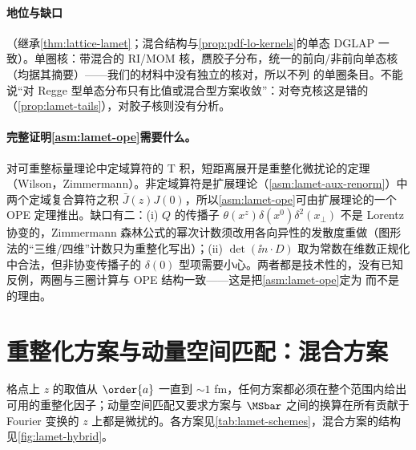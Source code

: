 \paragraph{地位与缺口}
\tagA（继承\cref{thm:lattice-lamet}；混合结构与\cref{prop:pdf-lo-kernels}的单态 DGLAP 一致）。单圈核：带混合的 RI/MOM 核\cite{Wang:2019tgg}，赝胶子分布\cite{Balitsky:2019krf}，统一的前向/非前向单态核\cite{Yao:2022vtp}（均据其摘要）——我们的材料中没有独立的核对，所以不列 \tagR 的单圈条目。不能说“对 Regge 型单态分布只有比值或混合型方案收敛”：对夸克核这是错的（\cref{prop:lamet-tails}），对胶子核则没有分析。

\paragraph{完整证明\cref{asm:lamet-ope}需要什么。}
对可重整标量理论中定域算符的 T 积，短距离展开是重整化微扰论的定理（Wilson\cite{Wilson1969}，Zimmermann\cite{Zimmermann1973}）。非定域算符是扩展理论（\cref{asm:lamet-aux-renorm}）中两个定域复合算符之积 $\bar J(z)J(0)$，所以\cref{asm:lamet-ope}可由扩展理论的一个 OPE 定理推出。缺口有二：(i) $Q$ 的传播子 $\theta(x^z)\delta(x^0)\delta^2(x_\perp)$ 不是 Lorentz 协变的，Zimmermann 森林公式的幂次计数须改用各向异性的发散度重做（图形法的“三维/四维”计数只为重整化写出）；(ii) $\det(\ii n\cdot D)$ 取为常数在维数正规化中合法，但非协变传播子的 $\delta(0)$ 型项需要小心。两者都是技术性的，没有已知反例，两圈与三圈计算与 OPE 结构一致——这是把\cref{asm:lamet-ope}定为 \tagA 而不是 \tagC 的理由。

\section{重整化方案与动量空间匹配：混合方案}\label{sec:lamet-schemes}

格点上 $z$ 的取值从 $\order{a}$ 一直到 $\sim1$ fm，任何方案都必须在整个范围内给出可用的重整化因子；动量空间匹配又要求方案与 $\MSbar$ 之间的换算在所有贡献于 Fourier 变换的 $z$ 上都是微扰的。各方案见\cref{tab:lamet-schemes}，混合方案的结构见\cref{fig:lamet-hybrid}。

